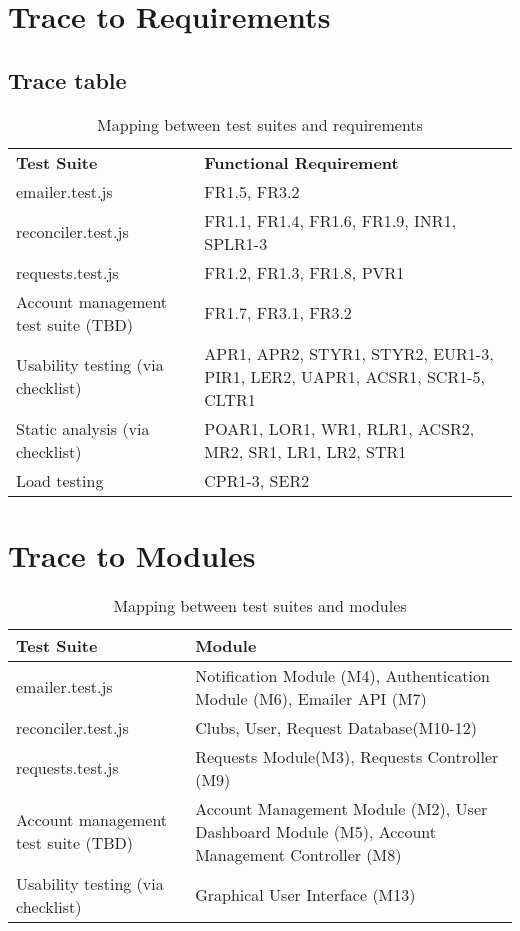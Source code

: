 \documentclass[12pt, titlepage]{article}
\begin{document}
\section{Trace to Requirements}
\subsection{Trace table}
\begin{table}[H]
\begin{tabularx}{\textwidth}{p{5cm}p{5cm}}
\toprule {\bf Test Suite} & {\bf Functional Requirement}\\
  emailer.test.js & FR1.5, FR3.2\\
  reconciler.test.js & FR1.1, FR1.4, FR1.6, FR1.9, INR1, SPLR1-3\\
  requests.test.js & FR1.2, FR1.3, FR1.8, PVR1\\ 
  Account management test suite (TBD) & FR1.7, FR3.1, FR3.2\\
  Usability testing (via checklist) & APR1, APR2, STYR1, STYR2, EUR1-3, PIR1, LER2, UAPR1, ACSR1, SCR1-5, CLTR1\\
  Static analysis (via checklist) & POAR1, LOR1, WR1, RLR1, ACSR2, MR2, SR1, LR1, LR2, STR1\\
  Load testing & CPR1-3, SER2\\
\end{tabularx}
\caption{Mapping between test suites and requirements}
\end{table}
\newpage


\section{Trace to Modules}
\begin{table}[H]
\begin{tabularx}{\textwidth}{p{5cm}p{5cm}}
\toprule {\bf Test Suite} & {\bf Module}\\
\midrule 
emailer.test.js & Notification Module (M4), Authentication Module (M6), Emailer API (M7)\\
reconciler.test.js & Clubs, User, Request Database(M10-12)\\
requests.test.js & Requests Module(M3), Requests Controller (M9)\\
Account management test suite (TBD) & Account Management Module (M2), User Dashboard Module (M5), Account Management Controller (M8)\\
Usability testing (via checklist) & Graphical User Interface (M13)\\
\bottomrule
\end{tabularx}
\caption{Mapping between test suites and modules}
\end{table}
\end{document}
